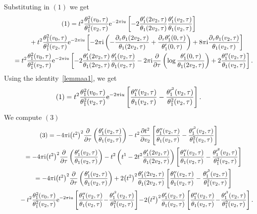\documentclass[pdftex]{sigma}%
\numberwithin{equation}{section}
\begin{document}
Substituting in $(1)$ we get
\begin{gather*}
(1)=t^2\frac{\theta_1^2(v_0,\tau)}{\theta_1^2(v_2,\tau)}{\rm e}^{-2\pi {\rm i} u}\left[ - 2\frac{\theta_1^{\prime}(2v_2,\tau)}{\theta_1(2v_2,\tau)} \frac{\theta_1^{\prime}(v_2,\tau)}{\theta_1(v_2,\tau)}\right]
\\ \hphantom{(1)=}
+t^2\frac{\theta_1^2(v_0,\tau)}{\theta_1^2(v_2,\tau)}{\rm e}^{-2\pi {\rm i} u}\left[ - 2\pi {\rm i}\left( - \frac{\partial_{\tau}\theta_1(2v_2,\tau)}{\theta_1(2v_2,\tau)} +\frac{\partial_{\tau}\theta_1^{\prime}(0,\tau)}{\theta_1^{\prime}(0,\tau)}\right)+8\pi {\rm i}\frac{\partial_{\tau}\theta_1(v_2,\tau)}{\theta_1(v_2,\tau)}\right]
\\ \hphantom{(1)}
{}=t^2\frac{\theta_1^2(v_0,\tau)}{\theta_1^2(v_2,\tau)}{\rm e}^{-2\pi {\rm i} u}\left[ - 2\frac{\theta_1^{\prime}(2v_2,\tau)}{\theta_1(2v_2,\tau)} \frac{\theta_1^{\prime}(v_2,\tau)}{\theta_1(v_2,\tau)}-2\pi {\rm i}\frac{\partial}{\partial \tau}\left( \log\frac{\theta_1^{\prime}(0,\tau)}{\theta_1(2v_2,\tau)}\right) +2\frac{\theta_1^{\prime\prime}(v_2,\tau)}{\theta_1(v_2,\tau)}\right].
\end{gather*}
Using the identity~\eqref{lemmaa1}, we get
\begin{gather*}
(1)=t^2\frac{\theta_1^2(v_0,\tau)}{\theta_1^2(v_2,\tau)}{\rm e}^{-2\pi {\rm i} u}\left[\frac{\theta_1^{\prime\prime}(v_2,\tau)}{\theta_1(v_2,\tau)} -\frac{\theta_1^{\prime^2}(v_2,\tau)}{\theta_1^2(v_2,\tau)}\right].
\end{gather*}
We compute $(3)$
\begin{gather*}
(3)=-4\pi {\rm i}\big(t^2\big)^2\frac{\partial}{\partial \tau}\left(\frac{\theta_1^{\prime}(v_2,\tau)}{\theta_1(v_2,\tau)}\right)
-t^2\frac{\partial t^2}{\partial v_2}\left[\frac{\theta_1^{\prime\prime}(v_2,\tau)}{\theta_1(v_2,\tau)} -\frac{\theta_1^{\prime^2}(v_2,\tau)}{\theta_1^2(v_2,\tau)}\right]
\\ \hphantom{(3)}
{}=-4\pi {\rm i}\big(t^2\big)^2\frac{\partial}{\partial \tau}\left(\frac{\theta_1^{\prime}(v_2,\tau)}{\theta_1(v_2,\tau)}\right) -t^2\left(t^1-2t^2\frac{\theta_1^{\prime}(2v_2,\tau)}{\theta_1(2v_2,\tau)}\right) \left[\frac{\theta_1^{\prime\prime}(v_2,\tau)}{\theta_1(v_2,\tau)} -\frac{\theta_1^{\prime^2}(v_2,\tau)}{\theta_1^2(v_2,\tau)}\right]
\\ \hphantom{(3)}
{}=-4\pi {\rm i}\big(t^2\big)^2\frac{\partial}{\partial \tau}\left(\frac{\theta_1^{\prime}(v_2,\tau)}{\theta_1(v_2,\tau)}\right)
+2\big(t^2\big)^2\frac{\theta_1^{\prime}(2v_2,\tau)}{\theta_1(2v_2,\tau)} \left[\frac{\theta_1^{\prime\prime}(v_2,\tau)}{\theta_1(v_2,\tau)} -\frac{\theta_1^{\prime^2}(v_2,\tau)}{\theta_1^2(v_2,\tau)}\right]
\\ \hphantom{(3)=}
{}-t^2\frac{\theta_1^2(v_0,\tau)}{\theta_1^2(v_2,\tau)}{\rm e}^{-2\pi {\rm i} u}\left[\frac{\theta_1^{\prime\prime}(v_2,\tau)}{\theta_1(v_2,\tau)} \!-\!\frac{\theta_1^{\prime^2}(v_2,\tau)}{\theta_1^2(v_2,\tau)}\right]
\!-\!2\big(t^2\big)^2\frac{\theta_1^{\prime}(v_2,\tau)}{\theta_1(v_2,\tau)} \left[\frac{\theta_1^{\prime\prime}(v_2,\tau)}{\theta_1(v_2,\tau)} \!-\!\frac{\theta_1^{\prime^2}(v_2,\tau)}{\theta_1^2(v_2,\tau)}\right].
\end{gather*}
\end{document}
